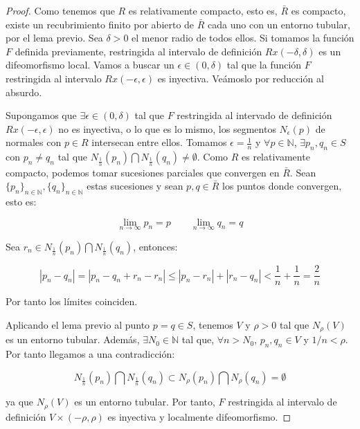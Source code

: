 \begin{proof}
Como tenemos que $R$ es relativamente compacto, esto es, $\bar{R}$ es compacto, existe un recubrimiento finito por abierto de $\bar{R}$ cada uno con un entorno tubular, por el lema previo. Sea $\delta > 0$ el menor radio de todos ellos. Si tomamos la función $F$ definida previamente, restringida al intervalo de definición $Rx(-\delta, \delta)$ es un difeomorfismo local. Vamos a buscar un $\epsilon \in (0,\delta)$ tal que la función $F$ restringida al intervalo $Rx(-\epsilon, \epsilon)$ es inyectiva. Veámoslo por reducción al absurdo.

Supongamos que $\exists \epsilon \in (0,\delta)$ tal que $F$ restringida al intervado de definición $Rx(-\epsilon, \epsilon)$ no es inyectiva, o lo que es lo mismo, los segmentos $N_\epsilon(p)$ de normales con $p \in R$ intersecan entre ellos. Tomamos $\epsilon=\frac{1}{n}$ y $\forall p \in \mathbb{N}$, $\exists p_n,q_n \in S$ con $p_n \neq q_n$ tal que $N_{\frac{1}{n}}(p_n) \bigcap N_{\frac{1}{n}}(q_n) \neq \emptyset$.
Como $R$ es relativamente compacto, podemos tomar sucesiones parciales que convergen en $\bar{R}$. Sean $\{p_n\}_{n \in \mathbb{N}}, \{q_n\}_{n \in \mathbb{N}}$ estas sucesiones y sean $p,q \in \bar{R}$ los puntos donde convergen, esto es:

\begin{equation*}
    \lim_{n\to\infty} p_n = p \qquad \lim_{n\to\infty} q_n = q
\end{equation*}

Sea $r_n \in N_{\frac{1}{n}}(p_n) \bigcap N_{\frac{1}{n}}(q_n)$, entonces:

\begin{equation*}
    |p_n - q_n| = |p_n - q_n + r_n - r_n| \leq |p_n-r_n| + |r_n-q_n| < \frac{1}{n}+\frac{1}{n} = \frac{2}{n}
\end{equation*}

Por tanto los límites coinciden.

Aplicando el lema previo al punto $p = q \in S$, tenemos $V$ y $\rho > 0$ tal que $N_\rho(V)$ es un entorno tubular. Además, $\exists N_0 \in \mathbb{N}$ tal que, $\forall n > N_0$, $p_n,q_n \in V$ y $1/n < \rho$. Por tanto llegamos a una contradicción:

\begin{equation*}
    N_{\frac{1}{n}}(p_n) \bigcap N_{\frac{1}{n}}(q_n) \subset N_\rho(p_n)\bigcap N_\rho(q_n) = \emptyset
\end{equation*}

ya que $N_\rho(V)$ es un entorno tubular. Por tanto, $F$ restringida al intervalo de definición $V \times (-\rho, \rho)$ es inyectiva y localmente difeomorfismo.

\end{proof}


